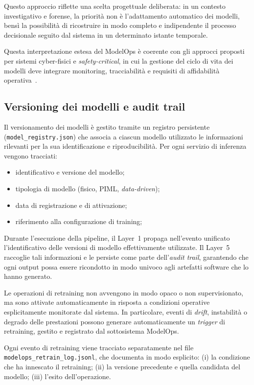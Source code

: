 Questo approccio riflette una scelta progettuale deliberata: in un contesto investigativo e forense, la priorità non è l’adattamento automatico dei modelli, bensì la possibilità di ricostruire in modo completo e indipendente il processo decisionale seguito dal sistema in un determinato istante temporale.

Questa interpretazione estesa del ModelOps è coerente con gli approcci proposti per sistemi cyber-fisici e \textit{safety-critical}, in cui la gestione del ciclo di vita dei modelli deve integrare monitoring, tracciabilità e requisiti di affidabilità operativa~\cite{faubel2025mlops_cps}.

\subsection{Versioning dei modelli e audit trail}

Il versionamento dei modelli è gestito tramite un registro persistente (\texttt{model\_registry.json}) che associa a ciascun modello utilizzato le informazioni rilevanti per la sua identificazione e riproducibilità.
Per ogni servizio di inferenza vengono tracciati:
\begin{itemize}
	\item identificativo e versione del modello;
	\item tipologia di modello (fisico, PIML, \textit{data-driven});
	\item data di registrazione e di attivazione;
	\item riferimento alla configurazione di training;
\end{itemize}

Durante l’esecuzione della pipeline, il Layer~1 propaga nell’evento unificato l’identificativo delle versioni di modello effettivamente utilizzate.
Il Layer~5 raccoglie tali informazioni e le persiste come parte dell’\textit{audit trail}, garantendo che ogni output possa essere ricondotto in modo univoco agli artefatti software che lo hanno generato.

Le operazioni di retraining non avvengono in modo opaco o non supervisionato, ma sono attivate automaticamente in risposta a condizioni operative esplicitamente monitorate dal sistema.
In particolare, eventi di \textit{drift}, instabilità o degrado delle prestazioni possono generare automaticamente un \textit{trigger} di retraining, gestito e registrato dal sottosistema ModelOps.

Ogni evento di retraining viene tracciato separatamente nel file \texttt{modelops\_retrain\_log.jsonl}, che documenta in modo esplicito:
(i) la condizione che ha innescato il retraining;
(ii) la versione precedente e quella candidata del modello;
(iii) l’esito dell’operazione.

